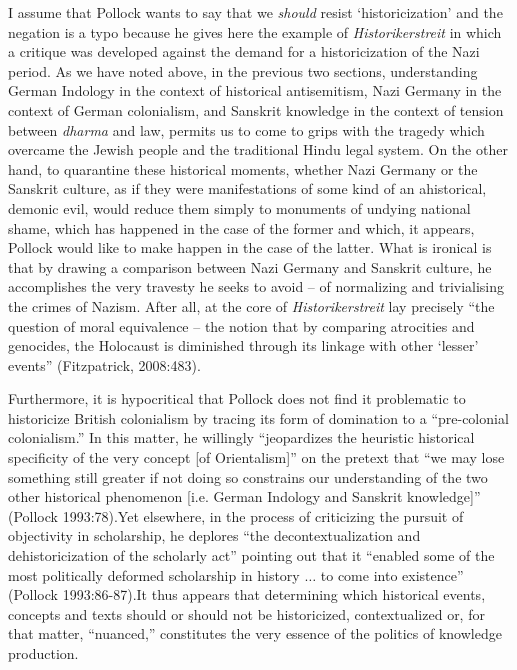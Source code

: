 I assume that Pollock wants to say that we {\sl should} resist ‘historicization’ and the negation is a typo because he gives here the example of {\sl Historikerstreit} in which a critique was developed against the demand for a historicization of the Nazi period. As we have noted above, in the previous two sections, understanding German Indology in the context of historical antisemitism, Nazi Germany in the context of German colonialism, and Sanskrit knowledge in the context of tension between {\sl dharma} and law, permits us to come to grips with the tragedy which overcame the Jewish people and the traditional Hindu legal system. On the other hand, to quarantine these historical moments, whether Nazi Germany or the Sanskrit culture, as if they were manifestations of some kind of an ahistorical, demonic evil, would reduce them simply to monuments of undying national shame, which has happened in the case of the former and which, it appears, Pollock would like to make happen in the case of the latter. What is ironical is that by drawing a comparison between Nazi Germany and Sanskrit culture, he accomplishes the very travesty he seeks to avoid – of normalizing and trivialising the crimes of Nazism. After all, at the core of {\sl Historikerstreit} lay precisely “the question of moral equivalence – the notion that by comparing atrocities and genocides, the Holocaust is diminished through its linkage with other ‘lesser’ events” (Fitzpatrick, 2008:483).

Furthermore, it is hypocritical that Pollock does not find it problematic to historicize British colonialism by tracing its form of domination to a “pre-colonial colonialism.” In this matter, he willingly “jeopardizes the heuristic historical specificity of the very concept [of Orientalism]” on the pretext that “we may lose something still greater if not doing so constrains our understanding of the two other historical phenomenon [i.e. German Indology and Sanskrit knowledge]” (Pollock 1993:78).Yet elsewhere, in the process of criticizing the pursuit of objectivity in scholarship, he deplores “the decontextualization and dehistoricization of the scholarly act” pointing out that it “enabled some of the most politically deformed scholarship in history $\ldots$ to come into existence” (Pollock 1993:86-87).It thus appears that determining which historical events, concepts and texts should or should not be historicized, contextualized or, for that matter, “nuanced,” constitutes the very essence of the politics of knowledge production.

